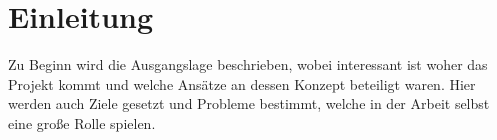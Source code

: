 \chapter{Einleitung} 
Zu Beginn wird die Ausgangslage beschrieben, wobei interessant ist woher das Projekt kommt und welche Ansätze an dessen Konzept beteiligt waren. Hier werden auch Ziele gesetzt und Probleme bestimmt, welche in der Arbeit selbst eine große Rolle spielen.